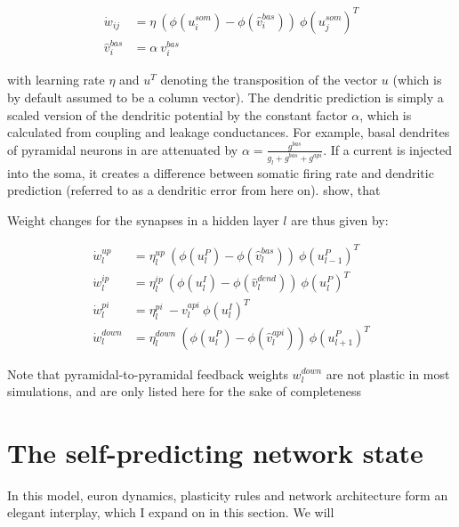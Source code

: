 \begin{align}
  \dot{w}_{ij}    & = \eta \ ( \phi(u_i^{som}) - \phi(\hat{v}_i^{bas}) ) \ \phi(u_j^{som})^T \\
  \hat{v}_i^{bas} & = \alpha \  v_i^{bas}
\end{align}

with learning rate $\eta$ and $u^T$ denoting the transposition of the vector $u$ (which is by default assumed to be a
column vector). The dendritic prediction is simply a scaled version of the dendritic potential by the constant factor
$\alpha$, which is calculated from coupling and leakage conductances. For example, basal dendrites of pyramidal neurons
in \cite{sacramento2018dendritic} are attenuated by $\alpha = \frac{g^{bas}}{g_l + g^{bas} + g^{api}}$. If a current is
injected into the soma, it creates a difference between somatic firing rate and dendritic prediction (referred to as a
dendritic error from here on). \cite{urbanczik2014learning} show, that 





Weight changes for the synapses in a hidden layer $l$ are thus given by:

\begin{align}
  \dot{w}_{l}^{up}   & = \eta_l^{up} \ ( \phi(u_l^{P}) - \phi(\hat{v}_l^{bas}) ) \ \phi(u_{l-1}^{P})^T\label{eq-delta_w_up} \\
  \dot{w}_{l}^{ip}   & = \eta_l^{ip} \ ( \phi(u_l^{I}) - \phi(\hat{v}_l^{dend}) ) \ \phi(u_{l}^{P})^T\label{eq-delta_w_ip}  \\
  \dot{w}_{l}^{pi}   & = \eta_l^{pi} \ - v_l^{api} \ \phi(u_l^{I})^T\label{eq-delta_w_pi}                                   \\
  \dot{w}_{l}^{down} & = \eta_l^{down} \ ( \phi(u_l^{P}) - \phi(\hat{v}_l^{api}) )\ \phi(u_{l+1}^{P})^T
\end{align}

Note that pyramidal-to-pyramidal feedback weights $w_l^{down}$ are not plastic in most simulations, and are only listed
here for the sake of completeness 




\section{The self-predicting network state}

In this model, euron dynamics, plasticity rules and network architecture form an elegant interplay, which I expand on in
this section. We will

